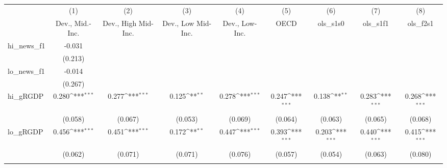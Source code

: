 {
\def\sym#1{\ifmmode^{#1}\else\(^{#1}\)\fi}
\begin{tabular}{l*{8}{c}}
\toprule
            &\multicolumn{1}{c}{(1)}&\multicolumn{1}{c}{(2)}&\multicolumn{1}{c}{(3)}&\multicolumn{1}{c}{(4)}&\multicolumn{1}{c}{(5)}&\multicolumn{1}{c}{(6)}&\multicolumn{1}{c}{(7)}&\multicolumn{1}{c}{(8)}\\
            &\multicolumn{1}{c}{Dev., Mid.-Inc.}&\multicolumn{1}{c}{Dev., High Mid-Inc.}&\multicolumn{1}{c}{Dev., Low Mid-Inc.}&\multicolumn{1}{c}{Dev., Low-Inc.}&\multicolumn{1}{c}{OECD}&\multicolumn{1}{c}{ols\_s1s0}&\multicolumn{1}{c}{ols\_s1f1}&\multicolumn{1}{c}{ols\_f2s1}\\
\midrule
hi\_news\_f1  &      -0.031         &                     &                     &                     &                     &                     &                     &                     \\
            &     (0.213)         &                     &                     &                     &                     &                     &                     &                     \\
\addlinespace
lo\_news\_f1  &      -0.014         &                     &                     &                     &                     &                     &                     &                     \\
            &     (0.267)         &                     &                     &                     &                     &                     &                     &                     \\
\addlinespace
hi\_gRGDP    &       0.280\sym{***}&       0.277\sym{***}&       0.125\sym{**} &       0.278\sym{***}&       0.247\sym{***}&       0.138\sym{**} &       0.283\sym{***}&       0.268\sym{***}\\
            &     (0.058)         &     (0.067)         &     (0.053)         &     (0.069)         &     (0.064)         &     (0.063)         &     (0.065)         &     (0.068)         \\
\addlinespace
lo\_gRGDP    &       0.456\sym{***}&       0.451\sym{***}&       0.172\sym{**} &       0.447\sym{***}&       0.393\sym{***}&       0.203\sym{***}&       0.440\sym{***}&       0.415\sym{***}\\
            &     (0.062)         &     (0.071)         &     (0.071)         &     (0.076)         &     (0.057)         &     (0.054)         &     (0.063)         &     (0.080)         \\
\addlinespace

\end{tabular}}
